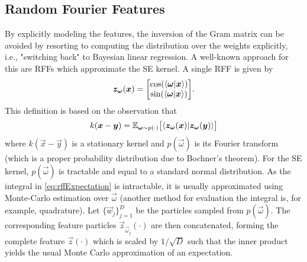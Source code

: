 \subsection{Random Fourier Features}
	By explicitly modeling the features, the inversion of the Gram matrix can be avoided by resorting to computing the distribution over the weights explicitly, i.e., "switching back" to Bayesian linear regression.
	A well-known approach for this are \acp{RFF}\cite{rahimiRandomFeaturesLargeScale2007} which approximate the \ac{SE} kernel.
	A single \ac{RFF} is given by
	\begin{equation}
		\vec{z}_{\vec{\omega}}(\vec{x}) =
			\begin{bmatrix}
				\cos(\ip{\vec{\omega}}{\vec{x}}) \\
				\sin(\ip{\vec{\omega}}{\vec{x}})
			\end{bmatrix}\!.
		\label{eq:rffFeature}
	\end{equation}
	This definition is based on the observation that
	\begin{equation}
		k(\vec{x} - \vec{y}) = \E_{\vec{\omega} \sim p(\cdot)}\bigl[ \ip{\vec{z}_{\vec{\omega}}(\vec{x})}{\vec{z}_{\vec{\omega}}(\vec{y})} \bigr]
		\label{eq:rffExpectation}
	\end{equation}
	where $k(\vec{x} - \vec{y})$ is a stationary kernel and $p(\vec{\omega})$ is its Fourier transform (which is a proper probability distribution due to Bochner's theorem\cite{steinInterpolationSpatialData1999}).
	For the \ac{SE} kernel, $p(\vec{\omega})$ is tractable and equal to a standard normal distribution\cite{rasmussenGaussianProcessesMachine2006}.
	As the integral in \cref{eq:rffExpectation} is intractable, it is usually approximated using Monte-Carlo estimation over $\vec{\omega}$ (another method for evaluation the integral is, for example, quadrature\cite{daoGaussianQuadratureKernel2017}).
	Let $\{ \vec{w}_j \}_{j = 1}^{D}$ be the particles sampled from $p(\vec{\omega})$.
	The corresponding feature particles $\vec{z}_{\vec{\omega}_j}(\cdot)$ are then concatenated, forming the complete feature $\vec{z}(\cdot)$ which is scaled by $1/\sqrt{D}$ such that the inner product yields the usual Monte Carlo approximation of an expectation.

